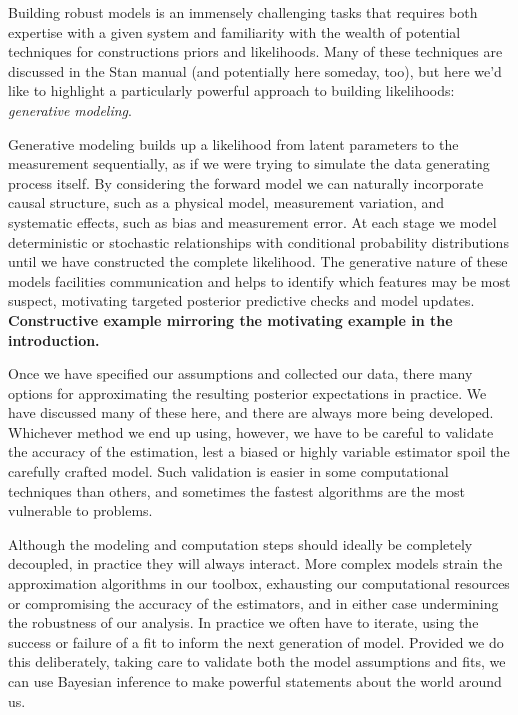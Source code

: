 Building robust models is an immensely challenging tasks
that requires both expertise with a given system and familiarity
with the wealth of potential techniques for constructions priors
and likelihoods.  Many of these techniques are discussed in
the Stan manual (and potentially here someday, too), but here
we'd like to highlight a particularly powerful approach to building
likelihoods: \emph{generative modeling}.  

Generative modeling builds up a likelihood from latent parameters
to the measurement sequentially, as if we were trying to simulate
the data generating process itself.  By considering the forward
model we can naturally incorporate causal structure, such as a 
physical model, measurement variation, and systematic effects,
such as bias and measurement error.  At each stage we model
deterministic or stochastic relationships with conditional probability
distributions until we have constructed the complete likelihood.
The generative nature of these models facilities communication
and helps to identify which features may be most suspect, 
motivating targeted posterior predictive checks and model updates.
\textbf{Constructive example mirroring the motivating example
in the introduction.}

Once we have specified our assumptions and collected our
data, there many options for approximating the resulting
posterior expectations in practice.  We have discussed many
of these here, and there are always more being developed.
Whichever method we end up using, however, we have to
be careful to validate the accuracy of the estimation, lest a 
biased or highly variable estimator spoil the carefully crafted
model.  Such validation is easier in some computational
techniques than others, and sometimes the fastest algorithms
are the most vulnerable to problems.

Although the modeling and computation steps should ideally
be completely decoupled, in practice they will always interact.
More complex models strain the approximation algorithms in
our toolbox, exhausting our computational resources or
compromising the accuracy of the estimators, and in either 
case undermining the robustness of our analysis.  In practice
we often have to iterate, using the success or failure of a
fit to inform the next generation of model.  Provided we do
this deliberately, taking care to validate both the model assumptions 
and fits, we can use Bayesian inference to make powerful
statements about the world around us.

